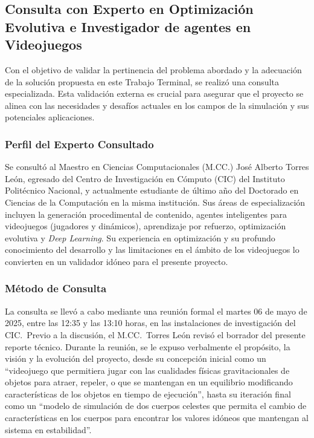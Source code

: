 \subsection[Consulta con experto núm. 01]{Consulta con Experto en Optimización Evolutiva e Investigador de agentes en Videojuegos}%
\label{subsec:validacion-experto}

Con el objetivo de validar la pertinencia del problema abordado y la adecuación de la solución propuesta en este Trabajo Terminal, se realizó una consulta especializada. Esta validación externa es crucial para asegurar que el proyecto se alinea con las necesidades y desafíos actuales en los campos de la simulación y sus potenciales aplicaciones.

\subsubsection{Perfil del Experto Consultado}

Se consultó al Maestro en Ciencias Computacionales (M.CC.) José Alberto Torres León, egresado del Centro de Investigación en Cómputo (CIC) del Instituto Politécnico Nacional, y actualmente estudiante de último año del Doctorado en Ciencias de la Computación en la misma institución. Sus áreas de especialización incluyen la generación procedimental de contenido, agentes inteligentes para videojuegos (jugadores y dinámicos), aprendizaje por refuerzo, optimización evolutiva y \textit{Deep Learning}. Su experiencia en optimización y su profundo conocimiento del desarrollo y las limitaciones en el ámbito de los videojuegos lo convierten en un validador idóneo para el presente proyecto.

\subsubsection{Método de Consulta}

La consulta se llevó a cabo mediante una reunión formal el martes 06 de mayo de 2025, entre las 12:35 y las 13:10 horas, en las instalaciones de investigación del CIC.\ Previo a la discusión, el M.CC.\ Torres León revisó el borrador del presente reporte técnico. Durante la reunión, se le expuso verbalmente el propósito, la visión y la evolución del proyecto, desde su concepción inicial como un ``videojuego que permitiera jugar con las cualidades físicas gravitacionales de objetos para atraer, repeler, o que se mantengan en un equilibrio modificando características de los objetos en tiempo de ejecución'', hasta su iteración final como un ``modelo de simulación de dos cuerpos celestes que permita el cambio de características en los cuerpos para encontrar los valores idóneos que mantengan al sistema en estabilidad''.

